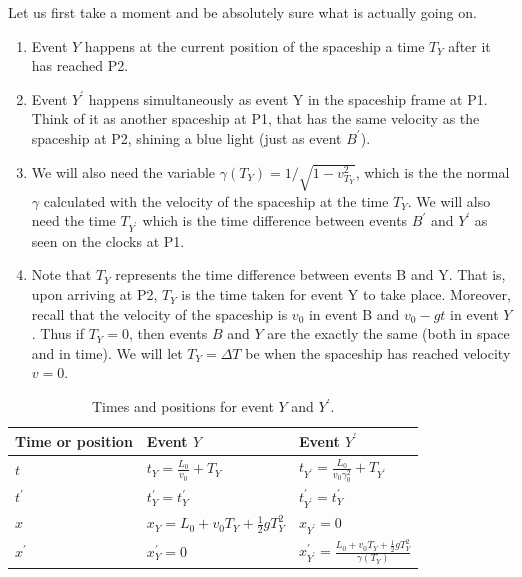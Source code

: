 \documentclass[a4paper,10pt,english]{article}
\begin{document}
\begin{enumerate}
\begin{enumerate}
Let us first take a moment and be absolutely sure what is actually going on.
\begin{enumerate} %
\item Event $Y$ happens at the current position of the spaceship a time $T_{Y}$ after it has reached P2.

\item Event $Y^{\prime}$ happens simultaneously as event Y in the spaceship frame at P1. Think of it as another spaceship at P1, that has the same velocity as the spaceship at P2, shining a blue light (just as event $B^{\prime}$).

\item We will also need the variable $\gamma(T_{Y})=1/\sqrt{1-v^{2}_{T_{Y}}}$, which is the the normal $\gamma$ calculated with the velocity of the spaceship at the time $T_{Y}$. We will also need the time $T_{Y^{\prime}}$ which is the time difference between events \(B^{\prime}\) and \(Y^{\prime}\) as seen on the clocks at P1.

\item Note that \(T_Y\) represents the time difference between events B and Y. That is, upon arriving at P2, \(T_Y\) is the time taken for event Y to take place. Moreover, recall that the velocity of the spaceship is \(v_0\) in event B and \(v_0-gt\) in event \(Y\). Thus if \(T_Y=0\), then events \(B\) and \(Y\) are the exactly the same (both in space and in time). We will let $T_{Y}=\Delta T$ be when the spaceship has reached velocity $v=0$.
\end{enumerate} %

\begin{table}[H]
  \begin{center}
    \begin{tabular}{| l | l | l |}
   	\hline
	 Time or position & Event $Y$ & Event $Y^{\prime}$\\ \hline
	 $t$ & $t_{Y}=\frac{L_{0}}{v_{0}}+T_{Y}$ & $t_{Y^{\prime}}=\frac{L_{0}}{v_{0}\gamma_{0}^{2}}+T_{Y^{\prime}}$\\ \hline
	 $t^{\prime}$ & $t_{Y}^{\prime}=t_{Y}^{\prime}$ & $t^{\prime}_{Y^{\prime}}=t_{Y}^{\prime}$\\ \hline
	 $x$ & $x_{Y}=L_{0}+v_{0}T_{Y}+\frac{1}{2}gT_{Y}^{2}$ & $x_{Y^{\prime}}=0$\\ \hline
	 $x^{\prime}$ & $x_{Y}^{\prime}=0$ & $x^{\prime}_{Y^{\prime}}=\frac{L_{0}+v_{0}T_{Y}+\frac{1}{2}gT_{Y}^{2}}{\gamma(T_{Y})}$\\ \hline
	\end{tabular}
    \caption{Times and positions for event $Y$ and $Y^{\prime}$.}
    \label{table:ex_2A_8_3}
  \end{center}
\end{table}
\FloatBarrier


\end{enumerate}
\end{enumerate}
\end{document}
